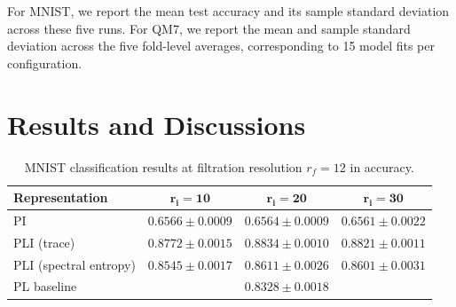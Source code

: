 \documentclass{article}
\begin{document}
For MNIST, we report the mean test accuracy and its sample standard deviation across these five runs. For QM7, we report the mean and sample standard deviation across the five fold-level averages, corresponding to 15 model fits per configuration.

\section{Results and Discussions}
\label{sec: results}

\begin{table}[t]
\centering
\caption{
MNIST classification results at filtration resolution \(r_f=12\) in accuracy.
}
\label{tab:mnist_accuracy_metrics}
\small
\setlength{\tabcolsep}{5pt}
\begin{tabular}{@{}l|c|c|c@{}}
\toprule
\textbf{Representation} & \(\boldsymbol{r_i=10}\) &
\(\boldsymbol{r_i=20}\) & \(\boldsymbol{r_i=30}\) \\
\midrule
PI & \(0.6566 \pm 0.0009\) & \(0.6564 \pm 0.0009\) & \(0.6561 \pm 0.0022\) \\
PLI (trace) & \(0.8772 \pm 0.0015\) &
\(\mathbf{0.8834 \pm 0.0010}\) & \(0.8821 \pm 0.0011\) \\
PLI (spectral entropy) & \(0.8545 \pm 0.0017\) &
\(0.8611 \pm 0.0026\) & \(0.8601 \pm 0.0031\) \\
\midrule
PL baseline & \multicolumn{3}{c}{\(0.8328 \pm 0.0018\)} \\
\bottomrule
\end{tabular}
\end{table}
\end{document}

